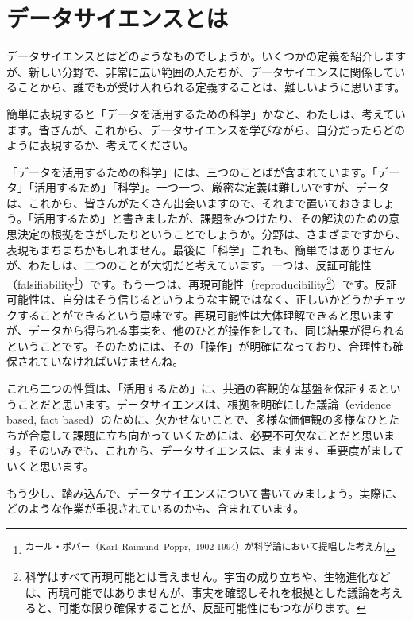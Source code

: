 \documentclass[
  xelatex, ja=standard]{bxjsbook}
\theoremstyle{definition}
\theoremstyle{definition}
\theoremstyle{definition}
\theoremstyle{definition}
\theoremstyle{remark}
\begin{document}
\hypertarget{ux30c7ux30fcux30bfux30b5ux30a4ux30a8ux30f3ux30b9ux3068ux306f}{%
\section{データサイエンスとは}\label{ux30c7ux30fcux30bfux30b5ux30a4ux30a8ux30f3ux30b9ux3068ux306f}}

データサイエンスとはどのようなものでしょうか。いくつかの定義を紹介しますが、新しい分野で、非常に広い範囲の人たちが、データサイエンスに関係していることから、誰でもが受け入れられる定義することは、難しいように思います。

簡単に表現すると「データを活用するための科学」かなと、わたしは、考えています。皆さんが、これから、データサイエンスを学びながら、自分だったらどのように表現するか、考えてください。

「データを活用するための科学」には、三つのことばが含まれています。「データ」「活用するため」「科学」。一つ一つ、厳密な定義は難しいですが、データは、これから、皆さんがたくさん出会いますので、それまで置いておきましょう。「活用するため」と書きましたが、課題をみつけたり、その解決のための意思決定の根拠をさがしたりということでしょうか。分野は、さまざまですから、表現もまちまちかもしれません。最後に「科学」これも、簡単ではありませんが、わたしは、二つのことが大切だと考えています。一つは、反証可能性（falsifiability\footnote{\textsuperscript{カール・ポパー（Karl~Raimund~Poppr,~1902-1994）が科学論において提唱した考え方{]}}}）です。もう一つは、再現可能性（reproducibility\footnote{科学はすべて再現可能とは言えません。宇宙の成り立ちや、生物進化などは、再現可能ではありませんが、事実を確認しそれを根拠とした議論を考えると、可能な限り確保することが、反証可能性にもつながります。}）です。反証可能性は、自分はそう信じるというような主観ではなく、正しいかどうかチェックすることができるという意味です。再現可能性は大体理解できると思いますが、データから得られる事実を、他のひとが操作をしても、同じ結果が得られるということです。そのためには、その「操作」が明確になっており、合理性も確保されていなければいけませんね。

これら二つの性質は、「活用するため」に、共通の客観的な基盤を保証するということだと思います。データサイエンスは、根拠を明確にした議論（evidence based, fact based）のために、欠かせないことで、多様な価値観の多様なひとたちが合意して課題に立ち向かっていくためには、必要不可欠なことだと思います。そのいみでも、これから、データサイエンスは、ますます、重要度がましていくと思います。

もう少し、踏み込んで、データサイエンスについて書いてみましょう。実際に、どのような作業が重視されているのかも、含まれています。
\end{document}
